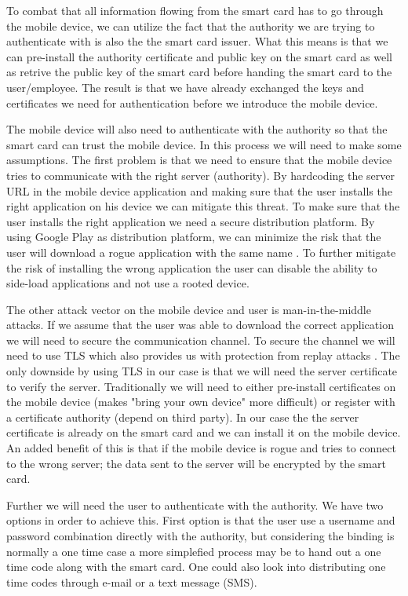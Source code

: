 To combat that all information flowing from the smart card has to go through the mobile device, we can utilize the fact that the authority we are trying to authenticate with is also the the smart card issuer. What this means is that we can pre-install the authority certificate and public key on the smart card as well as retrive the public key of the smart card before handing the smart card to the user/employee. The result is that we have already exchanged the keys and certificates we need for authentication before we introduce the mobile device.

The mobile device will also need to authenticate with the authority so that the smart card can trust the mobile device. In this process we will need to make some assumptions. The first problem is that we need to  ensure that the mobile device tries to communicate with the right server (authority). By hardcoding the server URL in the mobile device application and making sure that the user installs the right application on his device we can mitigate this threat. To make sure that the user installs the right application we need a secure distribution platform. By using Google Play as distribution platform, we can minimize the risk that the user will download a rogue application with the same name \cite{googlePlaySecureDist}. To further mitigate the risk of installing the wrong application the user can disable the ability to side-load applications and not use a rooted device.

The other attack vector on the mobile device and user is man-in-the-middle attacks. If we assume that the user was able to download the correct application we will need to secure the communication channel. To secure the channel we will need to use TLS \cite{rfc793} which also provides us with protection from replay attacks \cite{tlsOWASP}. The only downside by using TLS in our case is that we will need the server certificate to verify the server. Traditionally we will need to either pre-install certificates on the mobile device (makes "bring your own device" more difficult) or register with a certificate authority (depend on third party). In our case the the server certificate is already on the smart card and we can install it on the mobile device. An added benefit of this is that if the mobile device is rogue and tries to connect to the wrong server; the data sent to the server will be encrypted by the smart card.

Further we will need the user to authenticate with the authority. We have two options in order to achieve this. First option is that the user use a username and password combination directly with the authority, but considering the binding is normally a one time case a more simplefied process may be to hand out a one time code along with the smart card. One could also look into distributing one time codes through e-mail or a text message (SMS).

